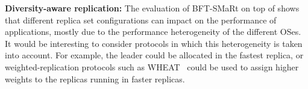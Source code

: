\textbf{Diversity-aware replication:}
The evaluation of BFT-SMaRt on top of \system shows that different replica set configurations can impact on the performance of applications, mostly due to the performance heterogeneity of the different OSes.
It would be interesting to consider protocols in which this heterogeneity is taken into account.
For example, the leader could be allocated in the fastest replica, or weighted-replication protocols such as WHEAT~\cite{Sousa:2015} could be used to assign higher weights to the replicas running in faster replicas.

